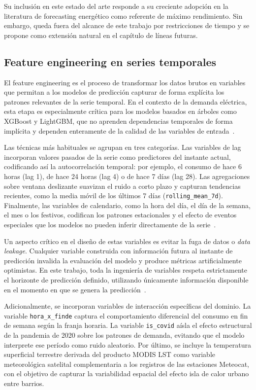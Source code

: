 \documentclass[12pt, a4paper]{article}
\begin{document}
Su inclusión en este estado del arte responde a su creciente adopción en la literatura de forecasting energético como referente de máximo rendimiento. Sin embargo, queda fuera del alcance de este trabajo por restricciones de tiempo y se propone como extensión natural en el capítulo de líneas futuras.

\subsection{Feature engineering en series temporales}


El feature engineering es el proceso de transformar los datos brutos en variables que permitan a los modelos de predicción capturar de forma explícita los patrones relevantes de la serie temporal. En el contexto de la demanda eléctrica, esta etapa es especialmente crítica para los modelos basados en árboles como XGBoost y LightGBM, que no aprenden dependencias temporales de forma implícita y dependen enteramente de la calidad de las variables de entrada~\cite{rubattu2023}.

Las técnicas más habituales se agrupan en tres categorías. Las variables de lag incorporan valores pasados de la serie como predictores del instante actual, codificando así la autocorrelación temporal: por ejemplo, el consumo de hace 6 horas (lag 1), de hace 24 horas (lag 4) o de hace 7 días (lag 28). Las agregaciones sobre ventana deslizante suavizan el ruido a corto plazo y capturan tendencias recientes, como la media móvil de los últimos 7 días (\texttt{rolling\_mean\_7d}). Finalmente, las variables de calendario, como la hora del día, el día de la semana, el mes o los festivos, codifican los patrones estacionales y el efecto de eventos especiales que los modelos no pueden inferir directamente de la serie~\cite{rubattu2023}.

Un aspecto crítico en el diseño de estas variables es evitar la fuga de datos o \textit{data leakage}. Cualquier variable construida con información futura al instante de predicción invalida la evaluación del modelo y produce métricas artificialmente optimistas. En este trabajo, toda la ingeniería de variables respeta estrictamente el horizonte de predicción definido, utilizando únicamente información disponible en el momento en que se genera la predicción~\cite{rubattu2023}.

Adicionalmente, se incorporan variables de interacción específicas del dominio. La variable \texttt{hora\_x\_finde} captura el comportamiento diferencial del consumo en fin de semana según la franja horaria. La variable \texttt{is\_covid} aísla el efecto estructural de la pandemia de 2020 sobre los patrones de demanda, evitando que el modelo interprete ese período como ruido aleatorio. Por último, se incluye la temperatura superficial terrestre derivada del producto MODIS LST como variable meteorológica satelital complementaria a los registros de las estaciones Meteocat, con el objetivo de capturar la variabilidad espacial del efecto isla de calor urbano entre barrios.
\end{document}
